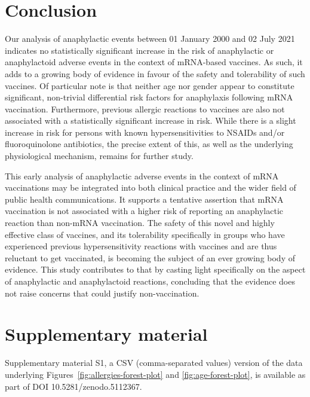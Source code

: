 \documentclass{article}
\begin{document}
\section{Conclusion}

Our analysis of anaphylactic events between 01 January 2000 and 02 July 2021 indicates no statistically significant increase in the risk of anaphylactic or anaphylactoid adverse events in the context of mRNA-based vaccines.
As such, it adds to a growing body of evidence in favour of the safety and tolerability of such vaccines.\cite{chu2021preliminary,baden2021efficacy,anderson2020safety}
Of particular note is that neither age nor gender appear to constitute significant, non-trivial differential risk factors for anaphylaxis following mRNA vaccination.
Furthermore, previous allergic reactions to vaccines are also not associated with a statistically significant increase in risk.
While there is a slight increase in risk for persons with known hypersensitivities to NSAIDs and/or fluoroquinolone antibiotics, the precise extent of this, as well as the underlying physiological mechanism, remains for further study.

This early analysis of anaphylactic adverse events in the context of mRNA vaccinations may be integrated into both clinical practice and the wider field of public health communications.
It supports a tentative assertion that mRNA vaccination is not associated with a higher risk of reporting an anaphylactic reaction than non-mRNA vaccination.
The safety of this novel and highly effective class of vaccines, and its tolerability specifically in groups who have experienced previous hypersensitivity reactions with vaccines and are thus reluctant to get vaccinated, is becoming the subject of an ever growing body of evidence.
This study contributes to that by casting light specifically on the aspect of anaphylactic and anaphylactoid reactions, concluding that the evidence does not raise concerns that could justify non-vaccination.

\vspace{6pt}

\section*{Supplementary material}

Supplementary material S1, a CSV (comma-separated values) version of the data underlying Figures~\ref{fig:allergies-forest-plot} and \ref{fig:age-forest-plot}, is available as part of DOI 10.5281/zenodo.5112367.
\end{document}
